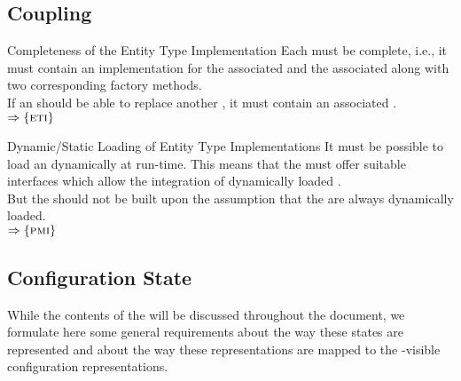 \documentclass[a4paper, 12pt]{book}
\newcommand{\INTERFACE}[1]{$\Rightarrow\left\{#1\right\}$}
\begin{document}
\subsection{Coupling}


\begin{requirement*}{Completeness of the Entity Type Implementation}
  Each  must be complete, i.e., it must contain
  an implementation for the associated  and
  the associated  along with two corresponding
  factory methods.\\
  If an  should be able to replace another
  , it must contain an associated .\\
  \INTERFACE{\ETI}
\end{requirement*}

\begin{requirement*}{Dynamic/Static Loading of Entity Type Implementations}
  It must be possible to load an  dynamically
  at run-time. This means that the \SYNEIGHT must offer suitable
  interfaces which allow the integration of dynamically loaded .\\
  But the \SYNEIGHT should not be built upon the assumption that the
   are always dynamically loaded.\\
  \INTERFACE{\PMI}
\end{requirement*}




\subsection{Configuration State}

While the contents of the  will be
discussed throughout the document, we formulate here some general requirements
about the way these states are represented and about the way these
representations are mapped to the -visible configuration
representations.
\end{document}
